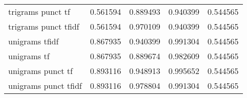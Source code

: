 \documentclass{article}
\begin{document}
\begin{table}
\begin{tabular}{lrrrr}
trigrams punct tf          &  0.561594 &     0.889493 &       0.940399 &             0.544565 \\
trigrams punct tfidf       &  0.561594 &     0.970109 &       0.940399 &             0.544565 \\
unigrams tfidf             &  0.867935 &     0.940399 &       0.991304 &             0.544565 \\
unigrams tf                &  0.867935 &     0.889674 &       0.982609 &             0.544565 \\
unigrams punct tf          &  0.893116 &     0.948913 &       0.995652 &             0.544565 \\
unigrams punct tfidf       &  0.893116 &     0.978804 &       0.991304 &             0.544565 \\
\bottomrule
\end{tabular}

\end{table}
\end{document}
